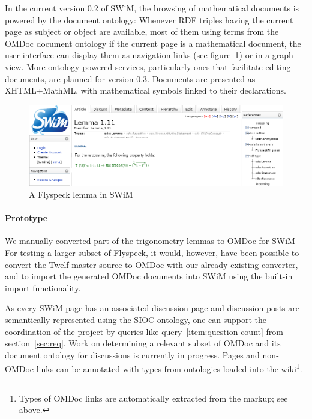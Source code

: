 In the current version 0.2 of SWiM, the browsing of mathematical documents is
powered by the document ontology: Whenever RDF triples having the current page
as subject or object are available, most of them using terms from the OMDoc
document ontology if the current page is a mathematical document, the
 user interface can display them as navigation links (see
figure~\ref{fig:swim-lemma}) or in a graph view.  More ontology-powered
services, particularly ones that facilitate editing documents, are planned for
version 0.3\cite{swim-roadmap,Lange:SWiMSciColl07}.  Documents are presented as
XHTML+MathML, with mathematical symbols linked to their declarations.

\begin{figure}
  \centering
  \includegraphics[width=\textwidth]{images/swim-lemma}
  \caption{A Flyspeck lemma in SWiM}
  \label{fig:swim-lemma}
\end{figure}

\paragraph{Prototype} We manually converted part of the trigonometry lemmas to
OMDoc for SWiM  For testing a larger subset of Flyspeck, it
would, however, have been possible to convert the Twelf master source to OMDoc
with our already existing converter, and to import the generated OMDoc documents
into SWiM using the built-in import functionality.

As every SWiM page has an associated discussion page and discussion posts are
semantically represented using the SIOC ontology\cite{SIOC:web}, one can support
the coordination of the project by queries like query~\ref{item:question-count}
from section~\ref{sec:req}.  Work on determining a relevant subset of OMDoc and
its document ontology for discussions is currently in progress.  Pages and non-OMDoc
links can be annotated with types from ontologies loaded into the
wiki\footnote{Types of OMDoc links are automatically extracted from the markup;
  see above.}.

